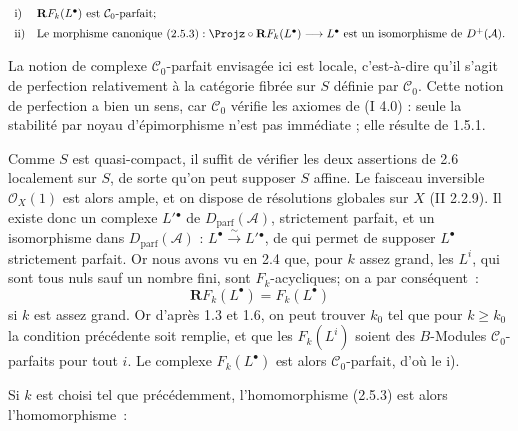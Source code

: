 \[
\begin{array}{ll}
\mathrm{i)}& \mathbf R F_k(L^{\bullet})\text{ est }\mathcal C_0
\text{-parfait};\\[2mm]
\mathrm{ii)}& \text{Le morphisme canonique }(2.5.3):
\Projz\circ\mathbf R F_k(L^{\bullet})\longrightarrow L^{\bullet}
\text{ est un isomorphisme de }D^+(\mathcal A).
\end{array}
\]

La notion de complexe $\mathcal C_0$-parfait envisagée ici est locale, c'est-à-dire qu'il s'agit de perfection relativement à la catégorie fibrée sur $S$ définie par $\mathcal C_0$. Cette notion de perfection a bien un sens, car $\mathcal C_0$ vérifie les axiomes de (I 4.0) : seule la stabilité par noyau d'épimorphisme n'est pas immédiate ; elle résulte de 1.5.1.

Comme $S$ est quasi-compact, il suffit de vérifier les deux assertions de 2.6 localement sur $S$, de sorte qu'on peut supposer $S$ affine. Le faisceau inversible $\mathcal O_X(1)$ est alors ample, et on dispose de résolutions globales sur $X$ (II 2.2.9). Il existe donc un complexe $L'{}^{\bullet}$ de $D_{\mathrm{parf}}(\mathcal A)$, strictement parfait, et un isomorphisme dans $D_{\mathrm{parf}}(\mathcal A)$ : $L^{\bullet}\xrightarrow{\sim}L'{}^{\bullet}$, de qui permet de supposer $L^{\bullet}$ strictement parfait. Or nous avons vu en 2.4 que, pour $k$ assez grand, les $L^i$, qui sont tous nuls sauf un nombre fini, sont $F_k$-acycliques; on a par conséquent~:
\[
  \mathbf R F_k(L^{\bullet})=F_k(L^{\bullet})
\]
si $k$ est assez grand. Or d'après 1.3 et 1.6, on peut trouver $k_0$ tel que pour $k\geq k_0$ la condition précédente soit remplie, et que les $F_k(L^i)$ soient des $B$-Modules $\mathcal C_0$-parfaits pour tout $i$. Le complexe $F_k(L^{\bullet})$ est alors $\mathcal C_0$-parfait, d'où le i).

Si $k$ est choisi tel que précédemment, l'homomorphisme (2.5.3) est alors l'homomorphisme~:
